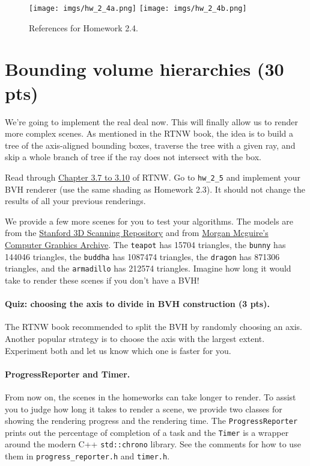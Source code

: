 \begin{figure}[ht]
    \centering
    \texttt{[image: imgs/hw\_2\_4a.png]}
    \texttt{[image: imgs/hw\_2\_4b.png]}
    \caption{References for Homework 2.4.}
    \label{fig:hw_2_4}
\end{figure}

\section{Bounding volume hierarchies (30 pts)}
We're going to implement the real deal now. This will finally allow us to render more complex scenes. As mentioned in the RTNW book, the idea is to build a tree of the axis-aligned bounding boxes, traverse the tree with a given ray, and skip a whole branch of tree if the ray does not intersect with the box. 

Read through \href{https://raytracing.github.io/books/RayTracingTheNextWeek.html#boundingvolumehierarchies/creatingboundingboxesoflistsofobjects}{Chapter 3.7 to 3.10} of RTNW. Go to \lstinline{hw_2_5} and implement your BVH renderer (use the same shading as Homework 2.3). It should not change the results of all your previous renderings.

We provide a few more scenes for you to test your algorithms. The models are from the \href{https://graphics.stanford.edu/data/3Dscanrep/}{Stanford 3D Scanning Repository} and from \href{https://casual-effects.com/data/}{Morgan Mcguire's Computer Graphics Archive}. The \lstinline{teapot} has 15704 triangles, the \lstinline{bunny} has 144046 triangles, the \lstinline{buddha} has 1087474 triangles, the \lstinline{dragon} has 871306 triangles, and the \lstinline{armadillo} has 212574 triangles. Imagine how long it would take to render these scenes if you don't have a BVH!

\paragraph{Quiz: choosing the axis to divide in BVH construction (3 pts).} The RTNW book recommended to split the BVH by randomly choosing an axis. Another popular strategy is to choose the axis with the largest extent. Experiment both and let us know which one is faster for you.

\paragraph{ProgressReporter and Timer.} From now on, the scenes in the homeworks can take longer to render. To assist you to judge how long it takes to render a scene, we provide two classes for showing the rendering progress and the rendering time. The \lstinline{ProgressReporter} prints out the percentage of completion of a task and the \lstinline{Timer} is a wrapper around the modern C++ \lstinline{std::chrono} library. See the comments for how to use them in \lstinline{progress_reporter.h} and \lstinline{timer.h}.

